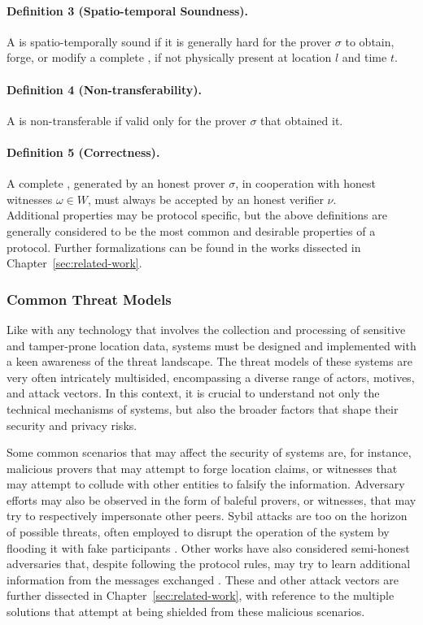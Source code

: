 \paragraph{Definition 3 (Spatio-temporal Soundness).} A \pol{} is spatio-temporally sound if it is generally hard for the prover $\sigma$ to obtain, forge, or modify a complete \pol{}, if not physically present at location $l$ and time $t$.

\paragraph{Definition 4 (Non-transferability).} A \pol{} is non-transferable if valid only for the prover $\sigma$ that obtained it.

\paragraph{Definition 5 (Correctness).} A complete \pol{}, generated by an honest prover $\sigma$, in cooperation with honest witnesses $\omega \in W$, must always be accepted by an honest verifier $\nu$.\\

Additional properties may be protocol specific, but the above definitions are generally considered to be the most common and desirable properties of a \pol{} protocol. Further formalizations can be found in the works dissected in Chapter~\ref{sec:related-work}.

\subsubsection{Common Threat Models}

Like with any technology that involves the collection and processing of sensitive and tamper-prone location data, \pol{} systems must be designed and implemented with a keen awareness of the threat landscape. The threat models of these systems are very often intricately multisided, encompassing a diverse range of actors, motives, and attack vectors. In this context, it is crucial to understand not only the technical mechanisms of \pol{} systems, but also the broader factors that shape their security and privacy risks. 

Some common scenarios that may affect the security of \pol{} systems are, for instance, malicious provers that may attempt to forge location claims, or witnesses that may attempt to collude with other entities to falsify the information. Adversary efforts may also be observed in the form of baleful provers, or witnesses, that may try to respectively impersonate other peers. Sybil attacks are too on the horizon of possible threats, often employed to disrupt the operation of the system by flooding it with fake participants \cite{nasrulin2018robust}. Other works have also considered semi-honest adversaries that, despite following the protocol rules, may try to learn additional information from the messages exchanged \cite{dupin2018location}. These and other attack vectors are further dissected in Chapter~\ref{sec:related-work}, with reference to the multiple solutions that attempt at being shielded from these malicious scenarios.


